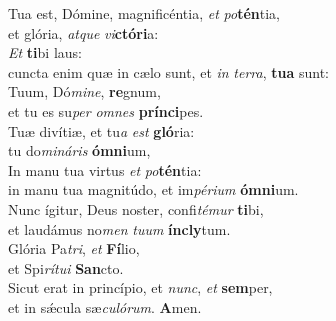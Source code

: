 \evenverse Tua est, Dómine, magnificéntia, \textit{et} \textit{po}\textbf{tén}tia,~\*\\
\evenverse et glória, \textit{at}\textit{que} \textit{vi}\textbf{ctó}\textbf{ri}a:\\
\oddverse \textit{Et} \textbf{ti}bi laus:~\*\\
\oddverse cuncta enim quæ in cælo sunt, et \textit{in} \textit{ter}\textit{ra}, \textbf{tu}\textbf{a} sunt:\\
\evenverse Tuum, Dó\textit{mi}\textit{ne}, \textbf{re}gnum,~\*\\
\evenverse et tu es su\textit{per} \textit{om}\textit{nes} \textbf{prín}\textbf{ci}pes.\\
\oddverse Tuæ divítiæ, et tu\textit{a} \textit{est} \textbf{gló}ria:~\*\\
\oddverse tu do\textit{mi}\textit{ná}\textit{ris} \textbf{óm}\textbf{ni}um,\\
\evenverse In manu tua virtus \textit{et} \textit{po}\textbf{tén}tia:~\*\\
\evenverse in manu tua magnitúdo, et im\textit{pé}\textit{ri}\textit{um} \textbf{óm}\textbf{ni}um.\\
\oddverse Nunc ígitur, Deus noster, confi\textit{té}\textit{mur} \textbf{ti}bi,~\*\\
\oddverse et laudámus no\textit{men} \textit{tu}\textit{um} \textbf{ín}\textbf{cly}tum.\\
\evenverse Glória Pa\textit{tri}, \textit{et} \textbf{Fí}lio,~\*\\
\evenverse et Spi\textit{rí}\textit{tu}\textit{i} \textbf{San}cto.\\
\oddverse Sicut erat in princípio, et \textit{nunc}, \textit{et} \textbf{sem}per,~\*\\
\oddverse et in sǽcula sæ\textit{cu}\textit{ló}\textit{rum}. \textbf{A}men.\\
